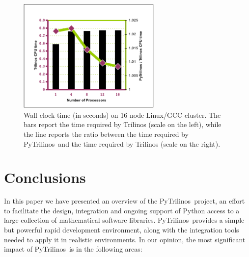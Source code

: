 \documentclass{llncs}
\newcommand{\PyTrilinos}{{\sc PyTrilinos}}
\begin{document}
\begin{figure}
  \begin{center}
    \includegraphics[width=7cm]{scalability-1k}
    \caption{Wall-clock time (in seconds) on 16-node Linux/GCC cluster.
      The bars report the time required by Trilinos (scale on the
      left), while the line reports the ratio between the time
      required by \PyTrilinos\ and the time required by Trilinos (scale
      on the right).}
    \label{fig:time_parallel_matvec}
  \end{center}
\end{figure}

\section{Conclusions}
\label{sec:discussion}

In this paper we have presented an overview of the
\PyTrilinos\ project, an effort to facilitate the design, integration
and ongoing support of Python access to a large collection of
mathematical software libraries.  \PyTrilinos\ provides a simple but
powerful rapid development environment, along with the integration
tools needed to apply it in realistic environments.  In our opinion,
the most significant impact of \PyTrilinos\ is in the following areas:
\end{document}
